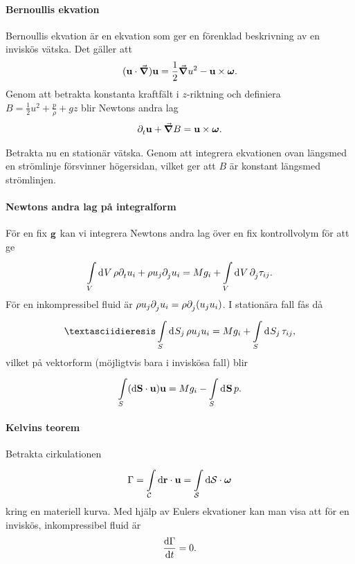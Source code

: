 \paragraph{Bernoullis ekvation}
Bernoullis ekvation är en ekvation som ger en förenklad beskrivning av en inviskös vätska. Det gäller att
\begin{align*}
	(\vb{u}\cdot\grad)\vb{u} = \frac{1}{2}\grad{u^{2}} - \vb{u}\times\vb*{\omega}.
\end{align*}
Genom att betrakta konstanta kraftfält i $z$-riktning och definiera $B = \frac{1}{2}u^{2} + \frac{p}{\rho} + gz$ blir Newtons andra lag
\begin{align*}
	\partial_{t}^{}\vb{u} + \grad{B} = \vb{u}\times\vb*{\omega}.
\end{align*}

Betrakta nu en stationär vätska. Genom att integrera ekvationen ovan längsmed en strömlinje försvinner högersidan, vilket ger att $B$ är konstant längsmed strömlinjen.

\paragraph{Newtons andra lag på integralform}
För en fix $\vb{g}$ kan vi integrera Newtons andra lag över en fix kontrollvolym för att ge
\begin{align*}
	\int\limits_{V}^{}\dd[]{V}\rho\partial_{t}^{}u_{i} + \rho u_{j}\partial_{j}^{}u_{i} = Mg_{i} + \int\limits_{V}^{}\dd[]{V}\partial_{j}^{}\tau_{ij}.
\end{align*}
För en inkompressibel fluid är $\rho u_{j}\partial_{j}^{}u_{i} = \rho \partial_{j}^{}(u_{j}u_{i})$. I stationära fall fås då
\begin{align*}
¨	\integ{S}{}{S_{j}}{\rho u_{j}u_{i}} = Mg_{i} + \integ{S}{}{S_{j}}{\tau_{ij}},
\end{align*}
vilket på vektorform (möjligtvis bara i inviskösa fall) blir
\begin{align*}
	\int\limits_{S}(\dd{\vb{S}}\cdot\vb{u})\vb{u} = Mg_{i} - \int\limits_{S}^{}\dd[]{\vb{S}}p.
\end{align*}

\paragraph{Kelvins teorem}
Betrakta cirkulationen
\begin{align*}
	\Gamma = \int\limits_{\mathcal{C}}^{}\dd{\vb{r}}\cdot \vb{u} = \int\limits_{\mathcal{S}}^{}\dd{\vb{\mathcal{S}}}\cdot \vb*{\omega}
\end{align*}
kring en materiell kurva. Med hjälp av Eulers ekvationer kan man visa att för en inviskös, inkompressibel fluid är
\begin{align*}
	\dv{\Gamma}{t} = 0.
\end{align*}

